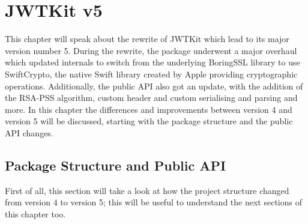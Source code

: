 \chapter{JWTKit v5}
This chapter will speak about the rewrite of JWTKit which lead to its major version number 5. During the rewrite, the package underwent a major overhaul which updated internals to switch from the underlying BoringSSL library to use SwiftCrypto, the native Swift library created by Apple providing cryptographic operations. Additionally, the public API also got an update, with the addition of the RSA-PSS algorithm, custom header and custom serialising and parsing and more. In this chapter the differences and improvements between version 4 and version 5 will be discussed, starting with the package structure and the public API changes.

\section{Package Structure and Public API}
First of all, this section will take a look at how the project structure changed from version 4 to version 5; this will be useful to understand the next sections of this chapter too. 

